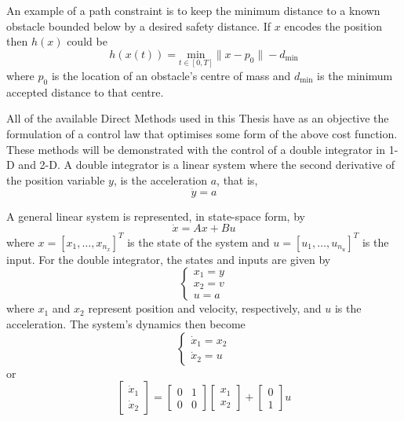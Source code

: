 \par An example of a path constraint is to keep the minimum distance to a known obstacle bounded below by a desired safety distance. If $x$ encodes the position then $h(x)$ could be
\begin{equation}
    \label{eq:example_constr}
    h(x(t)) = \underset{t\in[0,T]}{\text{min}}\lVert x - p_0 \rVert - d_{\text{min}}
\end{equation}
where $p_0$ is the location of an obstacle's centre of mass and $d_{\text{min}}$ is the minimum accepted distance to that centre.

\par All of the available Direct Methods used in this Thesis have as an objective the formulation of a control law that optimises some form of the above cost function. These methods will be demonstrated with the control of a double integrator in 1-D and 2-D. A double integrator is a linear system where the second derivative of the position variable $y$, is the acceleration $a$, that is,
\begin{equation}
    \ddot{y} = a
    \label{eq:basic_double_int}
\end{equation}
\par A general linear system is represented, in state-space form, by
\begin{equation}
    \dot{x} = Ax + Bu
    \label{eq:general_state_space}
\end{equation}
where $x = [x_1,\dots,x_{n_x}]^T$ is the state of the system and $u = [u_1,\dots,u_{n_u}]^T$ is the input. For the double integrator, the states and inputs are given by
\begin{equation}
\begin{cases}
    x_1 = y \\ x_2 = v \\ u = a
\end{cases}
\end{equation}
where $x_1$ and $x_2$ represent position and velocity, respectively, and $u$ is the acceleration. The system's dynamics then become
\begin{equation}
    \label{eq:dynamics_double_int}
    \begin{cases}
        \dot{x}_1 = x_2 \\
        \dot{x}_2 = u
    \end{cases}
\end{equation}
or
\begin{equation}
    \begin{bmatrix}
    \dot{x}_1 \\ \dot{x}_2
    \end{bmatrix} = 
    \begin{bmatrix} 0 & 1 \\ 0 & 0 \end{bmatrix} 
    \begin{bmatrix} x_1 \\ x_2 \end{bmatrix} + 
    \begin{bmatrix} 0 \\ 1 \end{bmatrix} u
    \label{eq:state_space_double_int}
\end{equation}
